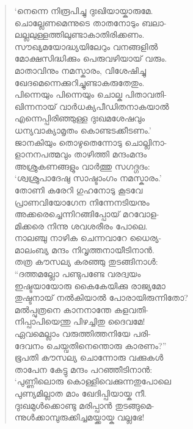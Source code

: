 \begin{verse}
‘നെന്നെ നിരൂപിച്ചു ദുഃഖിയായ്കാരുമേ.\\
ചൊല്ലേണമെന്നുടെ താതനോടും ബലാ-\\
ലല്ലലുള്ളത്തിലുണ്ടാകാതിരിക്കണം.\\
സൗഖ്യമയോദ്ധ്യയിലേറും വനങ്ങളില്‍\\
മോക്ഷസിദ്ധിക്കും പെരുവഴിയായ് വരും.\\
മാതാവിനും നമസ്കാരം, വിശേഷിച്ചു\\
ഖേദമെന്നെക്കുറിച്ചുണ്ടാകരുതേതും.\\
പിന്നെയും പിന്നെയും ചൊല്ക പിതാവതി-\\
ഖിന്നനായ് വാര്‍ധക്യപീഡിതനാകയാല്‍\\
എന്നെപ്പിരിഞ്ഞുള്ള ദുഃഖമശേഷവും\\
ധന്യവാക്യാമൃതം കൊണ്ടടക്കീടണം.’\\
ജാനകിയും തൊഴുതെന്നോടു ചൊല്ലിനാ-\\
ളാനനപത്മവും താഴിത്തി മന്ദംമന്ദം\\
അശ്രുകണങ്ങളും വാര്‍ത്തു സഗദ്ഗദം:\\
‘ശ്വശ്രുപാദേഷു സാഷ്ടാംഗം നമസ്കാരം.’\\
തോണി കരേറി ഗുഹനോടു കൂടവേ\\
പ്രാണവിയോഗേന നിന്നേനടിയനും\\
അക്കരെച്ചെന്നിറങ്ങിപ്പോയ് മറവോള-\\
മിക്കരെ നിന്നു ശവശരീരം പോലെ.\\
നാലഞ്ചു നാഴിക ചെന്നവാറേ ധൈര്യ-\\
മാലംബ്യ മന്ദം നിവൃത്തനായീടിനാന്‍.\\
തത്ര കൗസല്യ കരഞ്ഞു തുടങ്ങിനാള്‍:\\
“ദത്തമല്ലോ പണ്ടുപണ്ടേ വരദ്വയം\\
ഇഷ്ടയായോരു കൈകേയിക്കു രാജ്യമോ\\
തുഷ്ടനായ് നല്‍കിയാല്‍ പോരായിരുന്നിതോ?\\
മല്‍പ്പുത്രനെ കാനനാന്തേ കളവതി-\\
നിപ്പാപിയെന്തു പിഴച്ചിതു ദൈവമേ!\\
ഏവമെല്ലാം വരുത്തിത്തനിയേ പരി-\\
ദേവനം ചെയ്വതിനെന്തൊരു കാരണം?”\\
ഭൂപതി കൗസല്യ ചൊന്നോരു വക്കുകള്‍\\
താപേന കേട്ടു മന്ദം പറഞ്ഞീടിനാന്‍:\\
‘പുണ്ണിലൊരു കൊള്ളിവെക്കുന്നതുപോലെ\\
പുണ്യമില്ലാത മാം ഖേദിപ്പിയായ്ക നീ.\\
ദുഃഖമുള്‍ക്കൊണ്ടു മരിപ്പാന്‍ തുടങ്ങുമെ-\\
ന്നുള്‍ക്കാമ്പുരുക്കിച്ചമയ്ക്കായ്ക വല്ലഭേ!\\

\end{verse}
